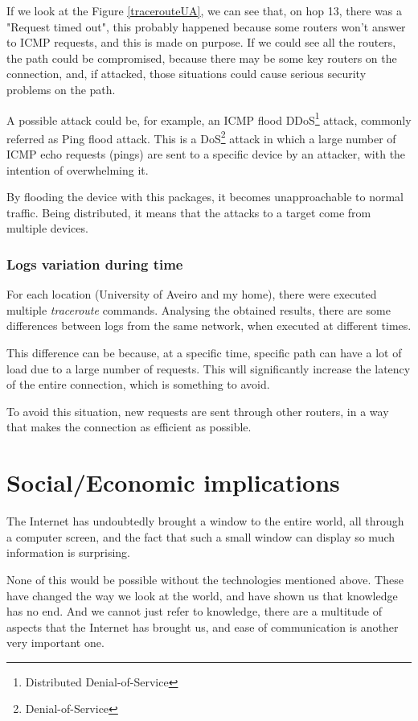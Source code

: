 \documentclass{article}
\newcommand\tab[1][1cm]{\hspace*{#1}}
\begin{document}
\tab If we look at the Figure \underline{\ref{tracerouteUA}}, we can see that, on hop 13, there was a "Request timed out", this probably happened because some routers won't answer to ICMP requests, and this is made on purpose. If we could see all the routers, the path could be compromised, because there may be some key routers on the connection, and, if attacked, those situations could cause serious security problems on the path.

A possible attack could be, for example, an ICMP flood DDoS\footnote{Distributed Denial-of-Service} attack, commonly referred as Ping flood attack. This is a DoS\footnote{Denial-of-Service} attack in which a large number of ICMP echo requests (pings) are sent to a specific device by an attacker, with the intention of overwhelming it. 

By flooding the device with this packages, it becomes unapproachable to normal traffic. Being distributed, it means that the attacks to a target come from multiple devices.

\subsubsection{Logs variation during time}

\tab For each location (University of Aveiro and my home), there were executed multiple \textit{traceroute} commands. Analysing the obtained results, there are some differences between logs from the same network, when executed at different times. 

This difference can be because, at a specific time, specific path can have a lot of load due to a large number of requests. This will significantly increase the latency of the entire connection, which is something to avoid.

To avoid this situation, new requests are sent through other routers, in a way that makes the connection as efficient as possible.

\newpage

\section{Social/Economic implications}

\tab The Internet has undoubtedly brought a window to the entire world, all through a computer screen, and the fact that such a small window can display so much information is surprising.

None of this would be possible without the technologies mentioned above. These have changed the way we look at the world, and have shown us that knowledge has no end. And we cannot just refer to knowledge, there are a multitude of aspects that the Internet has brought us, and ease of communication is another very important one.
\end{document}
